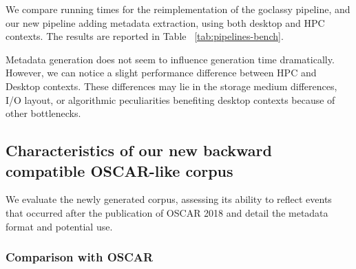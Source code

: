 \begin{table}[t]
    \centering\small
    \caption{Comparison of approximate generation times with and without metadata generation.}
    \label{tab:pipelines-bench}
\end{table}

We compare running times for the reimplementation of the goclassy pipeline, and our new pipeline adding metadata extraction, using both desktop and HPC contexts. The results are reported in Table ~\ref{tab:pipelines-bench}.

Metadata generation does not seem to influence generation time dramatically. However, we can notice a slight performance difference between HPC and Desktop contexts. These differences may lie in the storage medium differences, I/O layout, or algorithmic peculiarities benefiting desktop contexts because of other bottlenecks.


\subsection{Characteristics of our new backward compatible OSCAR-like corpus}

We evaluate the newly generated corpus, assessing its ability to reflect events that occurred after the publication of OSCAR 2018 and detail the metadata format and potential use.

\subsubsection{Comparison with OSCAR}

